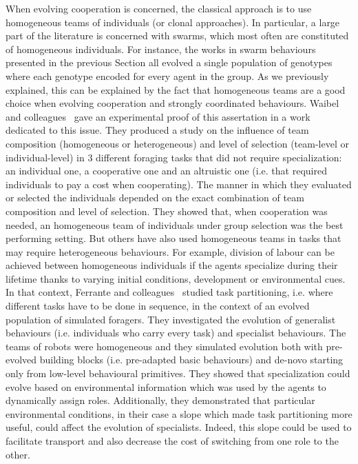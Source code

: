     When evolving cooperation is concerned, the classical approach is to use homogeneous teams of individuals (or clonal approaches). In particular, a large part of the literature is concerned with swarms, which most often are constituted of homogeneous individuals. For instance, the works in swarm behaviours presented in the previous Section all evolved a single population of genotypes where each genotype encoded for every agent in the group. As we previously explained, this can be explained by the fact that homogeneous teams are a good choice when evolving cooperation and strongly coordinated behaviours. Waibel and colleagues~\parencite{Waibel2009} gave an experimental proof of this assertation in a work dedicated to this issue. They produced a study on the influence of team composition (homogeneous or heterogeneous) and level of selection (team-level or individual-level) in $3$ different foraging tasks that did not require specialization: an individual one, a cooperative one and an altruistic one (i.e. that required individuals to pay a cost when cooperating). The manner in which they evaluated or selected the individuals depended on the exact combination of team composition and level of selection. They showed that, when cooperation was needed, an homogeneous team of individuals under group selection was the best performing setting. But others have also used homogeneous teams in tasks that may require heterogeneous behaviours. For example, division of labour can be achieved between homogeneous individuals if the agents specialize during their lifetime thanks to varying initial conditions, development or environmental cues. In that context, Ferrante and colleagues~\parencite{Ferrante2015} studied task partitioning, i.e. where different tasks have to be done in sequence, in the context of an evolved population of simulated foragers. They investigated the evolution of generalist behaviours (i.e. individuals who carry every task) and specialist behaviours. The teams of robots were homogeneous and they simulated evolution both with pre-evolved building blocks (i.e. pre-adapted basic behaviours) and de-novo starting only from low-level behavioural primitives. They showed that specialization could evolve based on environmental information which was used by the agents to dynamically assign roles. Additionally, they demonstrated that particular environmental conditions, in their case a slope which made task partitioning more useful, could affect the evolution of specialists. Indeed, this slope could be used to facilitate transport and also decrease the cost of switching from one role to the other.

